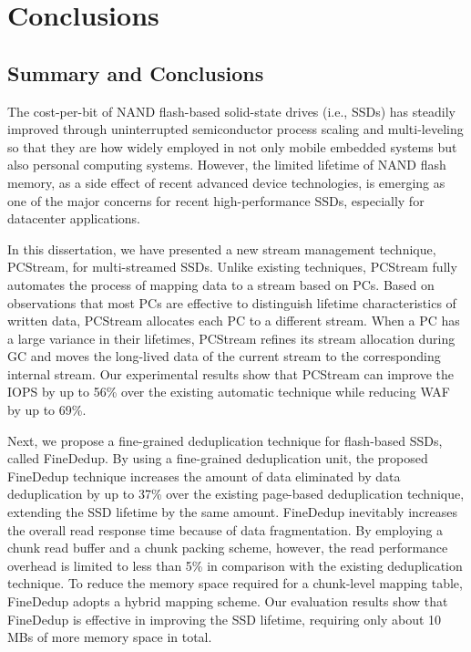 
\chapter{Conclusions}
\label{chap:Conclusions}

\section{Summary and Conclusions}
The cost-per-bit of NAND flash-based solid-state drives (i.e., SSDs) has 
steadily improved through uninterrupted semiconductor process scaling and 
multi-leveling so that they are how widely employed in not only mobile embedded 
systems but also personal computing systems.
However, the limited lifetime of NAND flash memory, as a side effect of recent 
advanced device technologies, is emerging as one of the major concerns for 
recent high-performance SSDs, especially for datacenter applications.

In this dissertation, 
we have presented a new stream management technique, \textsf{\small PCStream},
for multi-streamed SSDs.  Unlike existing techniques, \textsf{\small PCStream}
fully automates the process of mapping data to a stream based on PCs.  Based on
observations that most PCs are effective to distinguish lifetime
characteristics of written data, \textsf{\small PCStream} allocates each PC to
a different stream.  When a PC has a large variance in their lifetimes,
\textsf{\small PCStream} refines its stream allocation during GC and moves the
long-lived data of the current stream to the corresponding internal stream.
Our experimental results show that \textsf{\small PCStream} can improve the
IOPS by up to 56\% over the existing automatic technique while reducing WAF by
up to 69\%. 

Next, 
we propose a fine-grained deduplication technique for flash-based SSDs, called FineDedup.
By using a fine-grained deduplication unit,
the proposed FineDedup technique increases the amount of data eliminated 
by data deduplication by up to 37\% over the existing page-based deduplication technique,
extending the SSD lifetime by the same amount.
FineDedup inevitably increases the overall read response time because of data fragmentation.
By employing a chunk read buffer and a chunk packing scheme,
however, the read performance overhead is limited to less than 5\% 
in comparison with the existing deduplication technique.
To reduce the memory space required for a chunk-level mapping table,
FineDedup adopts a hybrid mapping scheme.
Our evaluation results show that 
FineDedup is effective in improving the SSD lifetime,
requiring only about 10 MBs of more memory space in total.

